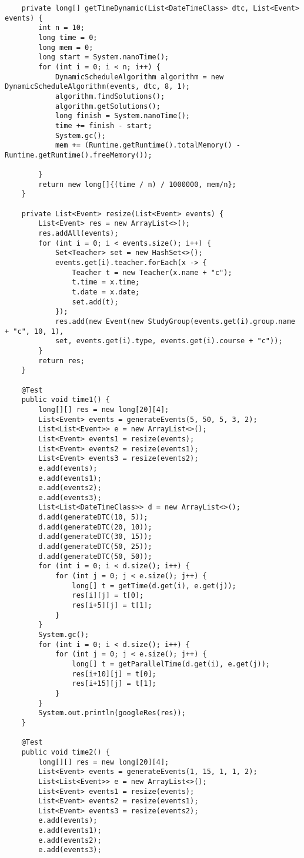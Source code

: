 \begin{lstlisting}
	private long[] getTimeDynamic(List<DateTimeClass> dtc, List<Event> events) {
		int n = 10;
		long time = 0;
		long mem = 0;
		long start = System.nanoTime();
		for (int i = 0; i < n; i++) {
			DynamicScheduleAlgorithm algorithm = new DynamicScheduleAlgorithm(events, dtc, 8, 1);
			algorithm.findSolutions();
			algorithm.getSolutions();
			long finish = System.nanoTime();
			time += finish - start;
			System.gc();
			mem += (Runtime.getRuntime().totalMemory() - Runtime.getRuntime().freeMemory());
			
		}
		return new long[]{(time / n) / 1000000, mem/n};
	}
	
	private List<Event> resize(List<Event> events) {
		List<Event> res = new ArrayList<>();
		res.addAll(events);
		for (int i = 0; i < events.size(); i++) {
			Set<Teacher> set = new HashSet<>();
			events.get(i).teacher.forEach(x -> {
				Teacher t = new Teacher(x.name + "c");
				t.time = x.time;
				t.date = x.date;
				set.add(t);
			});
			res.add(new Event(new StudyGroup(events.get(i).group.name + "c", 10, 1),
			set, events.get(i).type, events.get(i).course + "c"));
		}
		return res;
	}
	
	@Test
	public void time1() {
		long[][] res = new long[20][4];
		List<Event> events = generateEvents(5, 50, 5, 3, 2);
		List<List<Event>> e = new ArrayList<>();
		List<Event> events1 = resize(events);
		List<Event> events2 = resize(events1);
		List<Event> events3 = resize(events2);
		e.add(events);
		e.add(events1);
		e.add(events2);
		e.add(events3);
		List<List<DateTimeClass>> d = new ArrayList<>();
		d.add(generateDTC(10, 5));
		d.add(generateDTC(20, 10));
		d.add(generateDTC(30, 15));
		d.add(generateDTC(50, 25));
		d.add(generateDTC(50, 50));
		for (int i = 0; i < d.size(); i++) {
			for (int j = 0; j < e.size(); j++) {
				long[] t = getTime(d.get(i), e.get(j));
				res[i][j] = t[0];
				res[i+5][j] = t[1];
			}
		}
		System.gc();
		for (int i = 0; i < d.size(); i++) {
			for (int j = 0; j < e.size(); j++) {
				long[] t = getParallelTime(d.get(i), e.get(j));
				res[i+10][j] = t[0];
				res[i+15][j] = t[1];
			}
		}
		System.out.println(googleRes(res));
	}
	
	@Test
	public void time2() {
		long[][] res = new long[20][4];
		List<Event> events = generateEvents(1, 15, 1, 1, 2);
		List<List<Event>> e = new ArrayList<>();
		List<Event> events1 = resize(events);
		List<Event> events2 = resize(events1);
		List<Event> events3 = resize(events2);
		e.add(events);
		e.add(events1);
		e.add(events2);
		e.add(events3);
		

\end{lstlisting}
